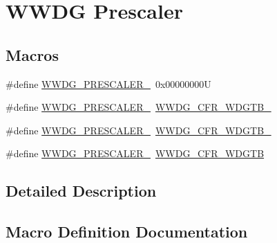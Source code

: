 \hypertarget{group___w_w_d_g___prescaler}{}\section{W\+W\+DG Prescaler}
\label{group___w_w_d_g___prescaler}
\subsection*{Macros}
\begin{DoxyCompactItemize}
\item 
\#define \hyperlink{group___w_w_d_g___prescaler_gac611617ca4116f9bfb55c5280abeb281}{W\+W\+D\+G\+\_\+\+P\+R\+E\+S\+C\+A\+L\+E\+R\+\_}~0x00000000U
\item 
\#define \hyperlink{group___w_w_d_g___prescaler_ga411e50531af74cfe88b5f58119e546fa}{W\+W\+D\+G\+\_\+\+P\+R\+E\+S\+C\+A\+L\+E\+R\+\_}~\hyperlink{group___peripheral___registers___bits___definition_gaab94b761166186987f91d342a5f79695}{W\+W\+D\+G\+\_\+\+C\+F\+R\+\_\+\+W\+D\+G\+T\+B\+\_}
\item 
\#define \hyperlink{group___w_w_d_g___prescaler_ga38093104d0ad7e9ef5e036f6d0dc3ca8}{W\+W\+D\+G\+\_\+\+P\+R\+E\+S\+C\+A\+L\+E\+R\+\_}~\hyperlink{group___peripheral___registers___bits___definition_ga9120ceb094ab327ec766a06fc66ef401}{W\+W\+D\+G\+\_\+\+C\+F\+R\+\_\+\+W\+D\+G\+T\+B\+\_}
\item 
\#define \hyperlink{group___w_w_d_g___prescaler_ga766a9eff85955164df09186081f3cb40}{W\+W\+D\+G\+\_\+\+P\+R\+E\+S\+C\+A\+L\+E\+R\+\_}~\hyperlink{group___peripheral___registers___bits___definition_ga067b1d8238f1d5613481aba71a946638}{W\+W\+D\+G\+\_\+\+C\+F\+R\+\_\+\+W\+D\+G\+TB}
\end{DoxyCompactItemize}


\subsection{Detailed Description}


\subsection{Macro Definition Documentation}
\mbox{\label{group___w_w_d_g___prescaler_gac611617ca4116f9bfb55c5280abeb281}} 
